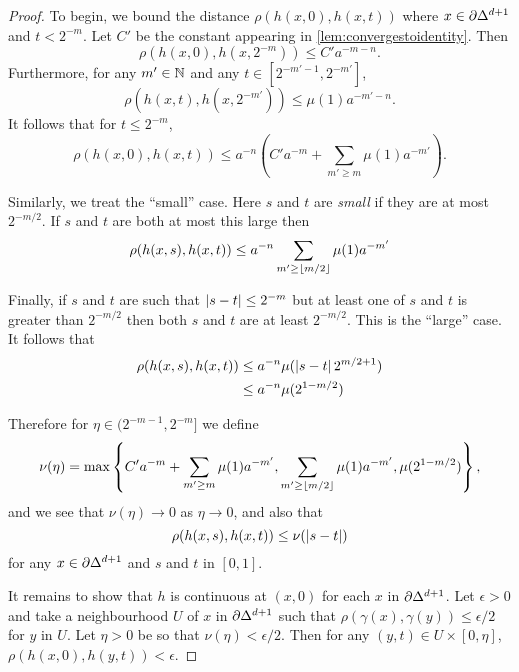 \documentclass[a4paper]{article}
\begin{document}
\begin{proof}
  To begin, we bound the distance $\rho(h(x,0), h(x,t))$
  where $x \in \partial \Delta^{d+1}$ and $t < 2^{-m}$. Let $C'$ be the
  constant appearing in \cref{lem:convergestoidentity}. Then 
  \begin{equation*}
    \rho(h(x,0), h(x,2^{-m})) \leq C'a^{-m-n}.
  \end{equation*}
  Furthermore, for any $m' \in \mathbb{N}$ and any $t \in [2^{-m'-1}, 2^{-m'}]$,
  \begin{equation*}
    \rho(h(x,t), h(x,2^{-m'})) \leq \mu(1)a^{-m'-n}.
  \end{equation*}
  It follows that for $t \leq 2^{-m}$,
  \begin{equation*}
    \rho(h(x,0), h(x,t)) \leq a^{-n}\left(C'a^{-m} + \sum_{m' \geq m}
          \mu(1)a^{-m'}\right).
  \end{equation*}

  Similarly, we treat the ``small'' case. Here $s$ and $t$ are \emph{small} if
  they are at most $2^{-m/2}$. If $s$ and $t$ are both at most this large
  then
  \begin{equation*}
    \rho(h(x,s), h(x,t)) \leq a^{-n} \sum_{m' \geq \lfloor m/2\rfloor} \mu(1) a^{-m'}
  \end{equation*}

  Finally, if $s$ and $t$ are such that $\left|s-t\right| \leq 2^{-m}$ but at least
  one of $s$ and $t$ is greater than $2^{-m/2}$ then both $s$ and $t$ are at
  least $2^{-m/2}$. This is the ``large'' case. It follows that 
  \begin{align*}
    \rho(h(x,s), h(x,t)) &\leq a^{-n} \mu(\left|s-t\right| 2^{m/2 + 1}) \\
                         &\leq a^{-n} \mu(2^{1-m/2})
  \end{align*}
  
  Therefore for $\eta \in (2^{-m-1}, 2^{-m}]$ we define
  \begin{equation*}
    \nu(\eta)  = \max\left\{
      C'a^{-m} + \sum_{m' \geq m} \mu(1)a^{-m'},
      \sum_{m' \geq \lfloor m/2\rfloor} \mu(1) a^{-m'},
      \mu(2^{1-m/2})
    \right\},
  \end{equation*}
  and we see that $\nu(\eta) \to 0$ as $\eta \to 0$, and also that
  \begin{equation*}
    \rho(h(x,s), h(x,t)) \leq \nu(\left|s-t\right|)
  \end{equation*}
  for any $x \in \partial\Delta^{d+1}$ and $s$ and $t$ in $[0,1]$.

  It remains to show that $h$ is continuous at $(x,0)$ for each $x$ in
  $\partial\Delta^{d+1}$. Let $\epsilon > 0$ and take a neighbourhood $U$ of
  $x$ in $\partial\Delta^{d+1}$ such that $\rho(\gamma(x), \gamma(y)) \leq
  \epsilon/2$ for $y$ in $U$. Let $\eta > 0$ be so that $\nu(\eta) <
  \epsilon/2$. Then for any $(y, t) \in U \times [0, \eta]$, $\rho(h(x,0),
  h(y,t)) < \epsilon$.
\end{proof}
\end{document}
